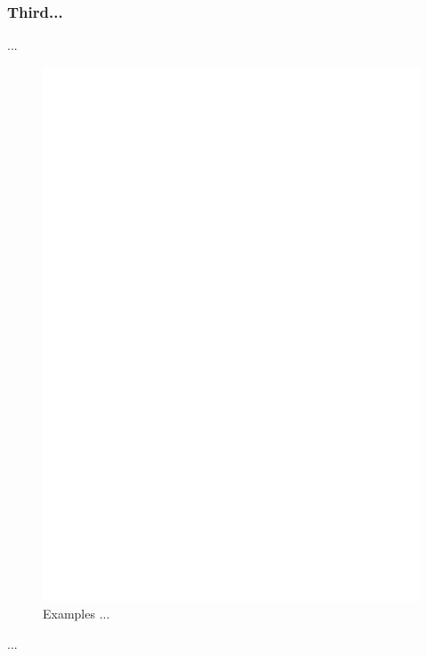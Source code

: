 \documentclass[runningheads]{llncs}
\begin{document}
\subsubsection{Third...} ...
\begin{figure}
\includegraphics[width=\textwidth]{fig1.pdf}
\caption{Examples ... } \label{fig3}
\end{figure}
...
\end{document}
